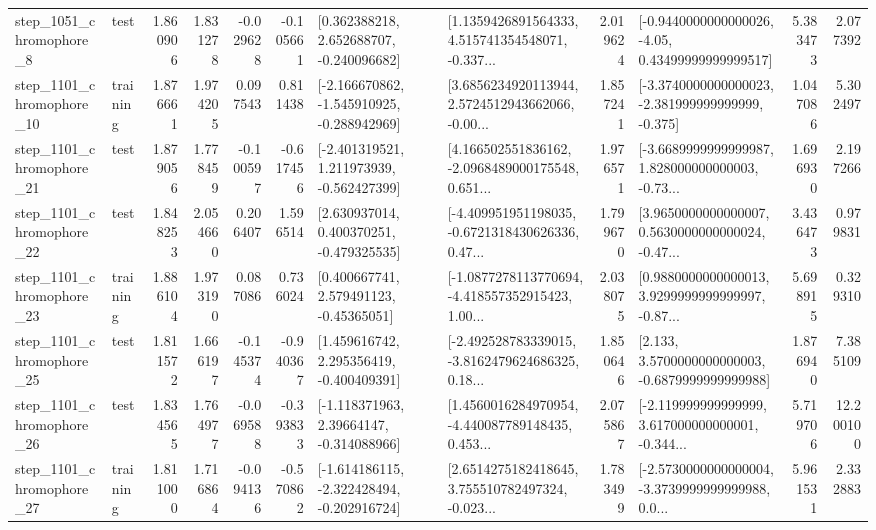 \begin{tabular}{llrrrrllrlrr}
  step\_1051\_chromophore\_8 &      test &      1.860906 &    1.831278 &     -0.029628 & -0.105661 &    [0.362388218, 2.652688707, -0.240096682] &  [1.1359426891564333, 4.515741354548071, -0.337... &       2.019624 &  [-0.9440000000000026, -4.05, 0.43499999999999517] &            5.383473 &          2.077392 \\
 step\_1101\_chromophore\_10 &  training &      1.876661 &    1.974205 &      0.097543 &  0.811438 &  [-2.166670862, -1.545910925, -0.288942969] &  [3.6856234920113944, 2.5724512943662066, -0.00... &       1.857241 &  [-3.3740000000000023, -2.381999999999999, -0.375] &            1.047086 &          5.302497 \\
 step\_1101\_chromophore\_21 &      test &      1.879056 &    1.778459 &     -0.100597 & -0.617456 &   [-2.401319521, 1.211973939, -0.562427399] &  [4.166502551836162, -2.0968489000175548, 0.651... &       1.976571 &  [-3.6689999999999987, 1.828000000000003, -0.73... &            1.696930 &          2.197266 \\
 step\_1101\_chromophore\_22 &      test &      1.848253 &    2.054660 &      0.206407 &  1.596514 &    [2.630937014, 0.400370251, -0.479325535] &  [-4.409951951198035, -0.6721318430626336, 0.47... &       1.799670 &  [3.9650000000000007, 0.5630000000000024, -0.47... &            3.436473 &          0.979831 \\
 step\_1101\_chromophore\_23 &  training &      1.886104 &    1.973190 &      0.087086 &  0.736024 &     [0.400667741, 2.579491123, -0.45365051] &  [-1.0877278113770694, -4.418557352915423, 1.00... &       2.038075 &  [0.9880000000000013, 3.9299999999999997, -0.87... &            5.698915 &          0.329310 \\
 step\_1101\_chromophore\_25 &      test &      1.811572 &    1.666197 &     -0.145374 & -0.940367 &    [1.459616742, 2.295356419, -0.400409391] &  [-2.492528783339015, -3.8162479624686325, 0.18... &       1.850646 &   [2.133, 3.5700000000000003, -0.6879999999999988] &            1.876940 &          7.385109 \\
 step\_1101\_chromophore\_26 &      test &      1.834565 &    1.764977 &     -0.069588 & -0.393833 &    [-1.118371963, 2.39664147, -0.314088966] &  [1.4560016284970954, -4.440087789148435, 0.453... &       2.075867 &  [-2.119999999999999, 3.617000000000001, -0.344... &            5.719706 &         12.200100 \\
 step\_1101\_chromophore\_27 &  training &      1.811000 &    1.716864 &     -0.094136 & -0.570862 &  [-1.614186115, -2.322428494, -0.202916724] &  [2.6514275182418645, 3.755510782497324, -0.023... &       1.783499 &  [-2.5730000000000004, -3.3739999999999988, 0.0... &            5.961531 &          2.332883 \\

\end{tabular}
